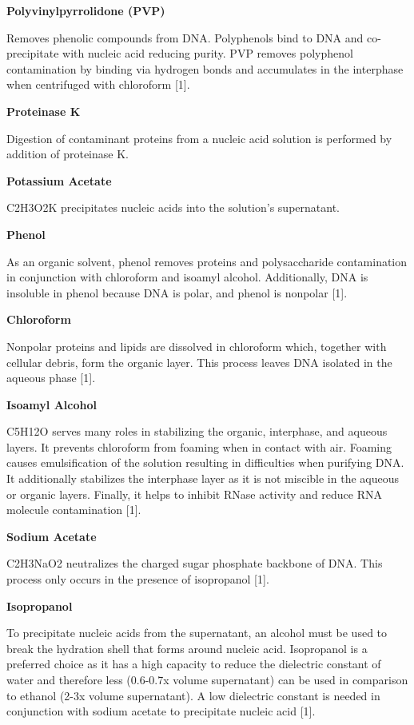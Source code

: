 \documentclass[
]{book}
\begin{document}
\textbf{Polyvinylpyrrolidone (PVP)}~

Removes phenolic compounds from DNA. Polyphenols bind to DNA and co-precipitate with nucleic acid reducing purity. PVP removes polyphenol contamination by binding via hydrogen bonds and accumulates in the interphase when centrifuged with chloroform {[}1{]}.~

\textbf{Proteinase K}~

Digestion of contaminant proteins from a nucleic acid solution is performed by addition of proteinase K.~

\textbf{Potassium Acetate}~

C2H3O2K precipitates nucleic acids into the solution's supernatant.~~

\textbf{Phenol}~

As an organic solvent, phenol removes proteins and polysaccharide contamination in conjunction with chloroform and isoamyl alcohol. Additionally, DNA is insoluble in phenol because DNA is polar, and phenol is nonpolar {[}1{]}.~

\textbf{Chloroform}~

Nonpolar proteins and lipids are dissolved in chloroform which, together with cellular debris, form the organic layer. This process leaves DNA isolated in the aqueous phase {[}1{]}.~

\textbf{Isoamyl Alcohol}~

C5H12O serves many roles in stabilizing the organic, interphase, and aqueous layers. It prevents chloroform from foaming when in contact with air. Foaming causes emulsification of the solution resulting in difficulties when purifying DNA. It additionally stabilizes the interphase layer as it is not miscible in the aqueous or organic layers. Finally, it helps to inhibit RNase activity and reduce RNA molecule contamination {[}1{]}.~

\textbf{Sodium Acetate}~

C2H3NaO2 neutralizes the charged sugar phosphate backbone of DNA. This process only occurs in the presence of isopropanol {[}1{]}.~

\textbf{Isopropanol}~

To precipitate nucleic acids from the supernatant, an alcohol must be used to break the hydration shell that forms around nucleic acid. Isopropanol is a preferred choice as it has a high capacity to reduce the dielectric constant of water and therefore less (0.6-0.7x volume supernatant) can be used in comparison to ethanol (2-3x volume supernatant). A low dielectric constant is needed in conjunction with sodium acetate to precipitate nucleic acid {[}1{]}.~
\end{document}
